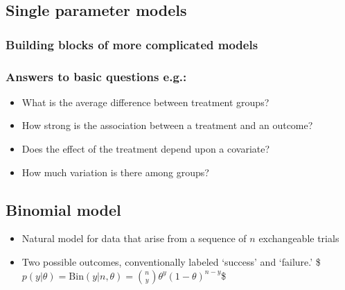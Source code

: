 \documentclass[letterpaper,10pt,english]{jupyterBook}
\begin{document}
\subsection{Single parameter models}
\label{\detokenize{Lecture 2:single-parameter-models}}

\subsubsection{Building blocks of more complicated models}
\label{\detokenize{Lecture 2:building-blocks-of-more-complicated-models}}

\subsubsection{Answers to basic questions e.g.:}
\label{\detokenize{Lecture 2:answers-to-basic-questions-e-g}}\begin{itemize}
\item {} 
\sphinxAtStartPar
What is the average difference between treatment groups?

\item {} 
\sphinxAtStartPar
How strong is the association between a treatment and an outcome?

\item {} 
\sphinxAtStartPar
Does the effect of the treatment depend upon a covariate?

\item {} 
\sphinxAtStartPar
How much variation is there among groups?

\end{itemize}


\subsection{Binomial model}
\label{\detokenize{Lecture 2:binomial-model}}\begin{itemize}
\item {} 
\sphinxAtStartPar
Natural model for data that arise from a sequence of \(n\) exchangeable trials

\item {} 
\sphinxAtStartPar
Two possible outcomes, conventionally labeled ‘success’ and ‘failure.’
\$\(
p(y|\theta)=\mathrm{Bin}(y|n,\theta)={n \choose y}\theta^y (1-\theta)^{n-y}
\)\$

\end{itemize}
\end{document}

